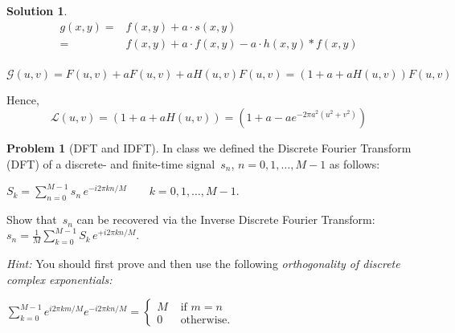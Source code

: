 \documentclass[11pt]{article}
\theoremstyle{plain}
\theoremstyle{definition}
\newtheorem{problem}{Problem}
\newtheorem{solution}{Solution}
\theoremstyle{remark}
\begin{document}
\begin{solution}
	\begin{eqnarray*}
		g(x,y) = &f(x,y) + a\cdot s(x,y)\\
		=& f(x,y) + a\cdot f(x,y) - a\cdot h(x,y)*f(x,y)\\
	\end{eqnarray*}
	
	\begin{equation*}
			\mathcal{G}(u,v) = F(u,v) + a F(u,v) + a H(u,v)F(u,v) = (1+a+aH(u,v))F(u,v)
	\end{equation*}
	
	Hence,
	\begin{equation*}
	\mathcal{L}(u,v) =  (1+a+aH(u,v)) = (1+a-ae^{-2\pi a^2(u^2+v^2)})
	\end{equation*}
	
\end{solution}
\begin{problem}[DFT and IDFT]
In class we defined the Discrete Fourier Transform (DFT) of
a discrete- and finite-time signal~$s_n$, $n=0,1,\ldots, M-1$
as follows:
\par\vspace{.15cm}
\hfill
$
\displaystyle
S_k = 
\sum_{n=0}^{M-1}s_n\,e^{-i2\pi kn/M}
\qquad
k=0,1,\ldots, M-1.
$
\hfill\mbox{ }
\par\vspace{-.25cm}
Show that~$s_n$ can be recovered via
the Inverse Discrete Fourier Transform:
$\displaystyle
s_n=\frac{1}{M}
\sum_{k=0}^{M-1}S_k\,e^{+i2\pi kn/M}.
$
\par\vspace{.15cm}
{\em Hint:} You should first prove and then 
use the following \em orthogonality \em of
discrete complex exponentials:
\par\vspace{.15cm}
\hfill
$
\displaystyle
\sum_{k=0}^{M-1}
e^{i2\pi km/M}
e^{-i2\pi kn/M}=
\left\{
\begin{array}{ll}
M&\mbox{ if }m=n\\
0 &\mbox{ otherwise}.
\end{array}
\right.
$
\hfill\mbox{ }
\end{problem}
\end{document}
